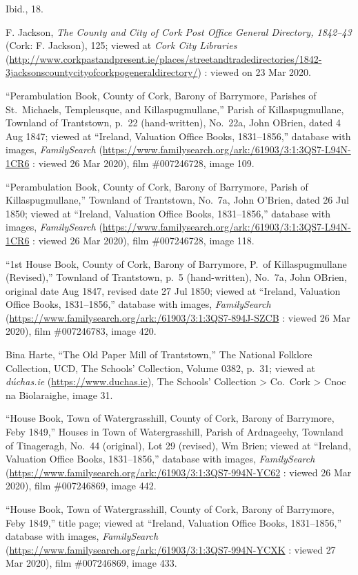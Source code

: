 \begin{thebibliography}{99}
	Ibid., 18.
	
	F. Jackson, \textit{The County and City of Cork Post Office General Directory, 1842--43} (Cork: F. Jackson), 125; viewed at \textit{Cork City Libraries} (\url{http://www.corkpastandpresent.ie/places/streetandtradedirectories/1842-3jacksonscountycityofcorkpogeneraldirectory/}) : viewed on 23 Mar 2020.
	
	``Perambulation Book, County of Cork, Barony of Barrymore, Parishes of St.\ Michaels, Templeusque, and Killaspugmullane,'' Parish of Killaspugmullane, Townland of Trantstown, p.\ 22 (hand-written), No.\ 22a, John OBrien, dated 4 Aug 1847; viewed at ``Ireland, Valuation Office Books, 1831--1856,'' database with images, \textit{FamilySearch} (\url{https://www.familysearch.org/ark:/61903/3:1:3QS7-L94N-1CR6} : viewed 26 Mar 2020), film \#007246728, image 109.
	
	``Perambulation Book, County of Cork, Barony of Barrymore, Parish of Killaspugmullane,'' Townland of Trantstown, No.\ 7a, John O'Brien, dated 26 Jul 1850; viewed at ``Ireland, Valuation Office Books, 1831--1856,'' database with images, \textit{FamilySearch} (\url{https://www.familysearch.org/ark:/61903/3:1:3QS7-L94N-1CR6} : viewed 26 Mar 2020), film \#007246728, image 118.
	
	``1st House Book, County of Cork, Barony of Barrymore, P.\ of Killaspugmullane (Revised),'' Townland of Trantstown, p.\ 5 (hand-written), No.\ 7a, John OBrien, original date Aug 1847, revised date 27 Jul 1850; viewed at ``Ireland, Valuation Office Books, 1831--1856,'' database with images, \textit{FamilySearch} (\url{https://www.familysearch.org/ark:/61903/3:1:3QS7-894J-SZCB} : viewed 26 Mar 2020), film \#007246783, image 420.
		
	Bina Harte, ``The Old Paper Mill of Trantstown,'' The National Folklore Collection, UCD, The Schools' Collection, Volume 0382, p.\ 31; viewed at \textit{d\'{u}chas.ie} (\url{https://www.duchas.ie}), The Schools' Collection > Co.\ Cork > Cnoc na Biolaraighe, image 31.
	
	``House Book, Town of Watergrasshill, County of Cork, Barony of Barrymore, Feby 1849,'' Houses in Town of Watergrasshill, Parish of Ardnageehy, Townland of Tinageragh, No.\ 44 (original), Lot 29 (revised), Wm Brien; viewed at ``Ireland, Valuation Office Books, 1831--1856,'' database with images, \textit{FamilySearch} (\url{https://www.familysearch.org/ark:/61903/3:1:3QS7-994N-YC62} : viewed 26 Mar 2020), film \#007246869, image 442.
	
	``House Book, Town of Watergrasshill, County of Cork, Barony of Barrymore, Feby 1849,'' title page; viewed at ``Ireland, Valuation Office Books, 1831--1856,'' database with images, \textit{FamilySearch} (\url{https://www.familysearch.org/ark:/61903/3:1:3QS7-994N-YCXK} : viewed 27 Mar 2020), film \#007246869, image 433.
	
			
\end{thebibliography}